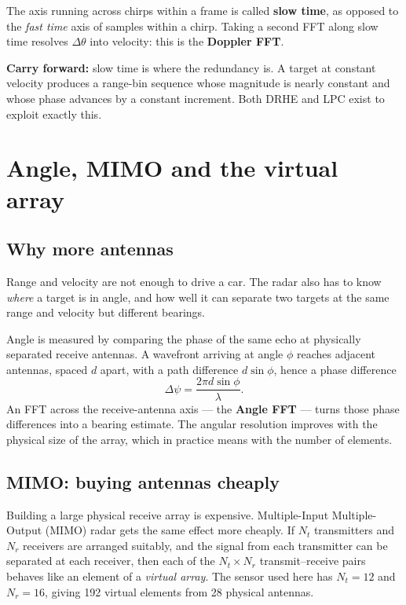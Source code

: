 The axis running across chirps within a frame is called \textbf{slow time}, as
opposed to the \emph{fast time} axis of samples within a chirp. Taking a second
FFT along slow time resolves $\Delta\theta$ into velocity: this is the
\textbf{Doppler FFT}.

\begin{keybox}
\textbf{Carry forward:} slow time is where the redundancy is. A target at
constant velocity produces a range-bin sequence whose magnitude is nearly
constant and whose phase advances by a constant increment. Both DRHE and LPC
exist to exploit exactly this.
\end{keybox}

\section{Angle, MIMO and the virtual array}
\label{sec:mimo}

\subsection{Why more antennas}

Range and velocity are not enough to drive a car. The radar also has to know
\emph{where} a target is in angle, and how well it can separate two targets at
the same range and velocity but different bearings.

Angle is measured by comparing the phase of the same echo at physically
separated receive antennas. A wavefront arriving at angle $\phi$ reaches
adjacent antennas, spaced $d$ apart, with a path difference $d\sin\phi$, hence
a phase difference
\begin{equation}
\label{eq:steering}
\Delta\psi = \frac{2\pi d \sin\phi}{\lambda}.
\end{equation}
An FFT across the receive-antenna axis --- the \textbf{Angle FFT} --- turns
those phase differences into a bearing estimate. The angular resolution
improves with the physical size of the array, which in practice means with the
number of elements.

\subsection{MIMO: buying antennas cheaply}

Building a large physical receive array is expensive. Multiple-Input
Multiple-Output (MIMO) radar gets the same effect more cheaply. If $N_t$
transmitters and $N_r$ receivers are arranged suitably, and the signal from
each transmitter can be separated at each receiver, then each of the
$N_t \times N_r$ transmit--receive pairs behaves like an element of a
\emph{virtual array}. The sensor used here has $N_t = 12$ and $N_r = 16$,
giving \num{192} virtual elements from \num{28} physical antennas.

